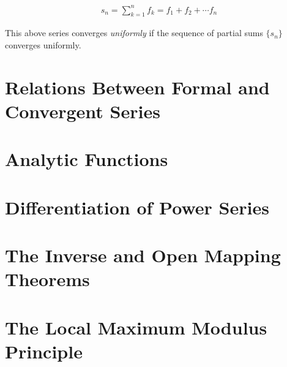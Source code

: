 \begin{defn}
  \begin{align*}
    s_n = \sum_{k = 1}^{n} f_k = f_1 + f_2 + \cdots f_n
  \end{align*}
\end{defn}

This above series converges \emph{uniformly} if the sequence of partial sums $\{s_n\}$ converges uniformly.

\section{Relations Between Formal and Convergent Series}
\section{Analytic Functions}
\section{Differentiation of Power Series}
\section{The Inverse and Open Mapping Theorems}
\section{The Local Maximum Modulus Principle}